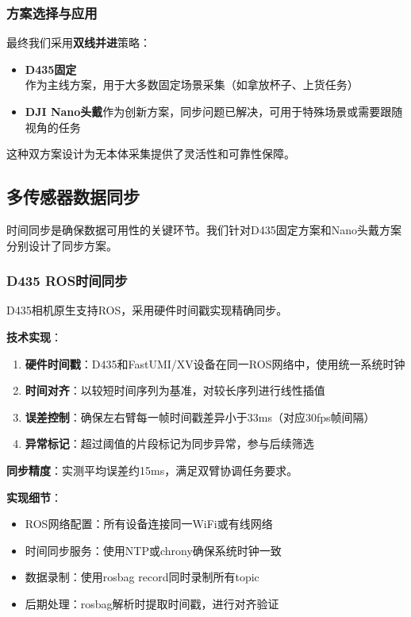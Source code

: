 \subsubsection{方案选择与应用}

最终我们采用\textbf{双线并进}策略：
\begin{itemize}[leftmargin=2em]
    \item \textbf{D435固定}作为主线方案，用于大多数固定场景采集（如拿放杯子、上货任务）
    \item \textbf{DJI Nano头戴}作为创新方案，同步问题已解决，可用于特殊场景或需要跟随视角的任务
\end{itemize}

这种双方案设计为无本体采集提供了灵活性和可靠性保障。

\subsection{多传感器数据同步}

时间同步是确保数据可用性的关键环节。我们针对D435固定方案和Nano头戴方案分别设计了同步方案。

\subsubsection{D435 ROS时间同步}

D435相机\cite{intel2018realsense}原生支持ROS\cite{quigley2009ros,koubaa2016ros}，采用硬件时间戳实现精确同步。

\textbf{技术实现}：
\begin{enumerate}[leftmargin=2em]
    \item \textbf{硬件时间戳}：D435和FastUMI/XV设备在同一ROS网络中，使用统一系统时钟
    \item \textbf{时间对齐}：以较短时间序列为基准，对较长序列进行线性插值
    \item \textbf{误差控制}：确保左右臂每一帧时间戳差异小于33ms（对应30fps帧间隔）
    \item \textbf{异常标记}：超过阈值的片段标记为同步异常，参与后续筛选
\end{enumerate}

\textbf{同步精度}：实测平均误差约15ms，满足双臂协调任务要求。

\textbf{实现细节}：
\begin{itemize}[leftmargin=2em]
    \item ROS网络配置：所有设备连接同一WiFi或有线网络
    \item 时间同步服务：使用NTP或chrony确保系统时钟一致
    \item 数据录制：使用rosbag record同时录制所有topic
    \item 后期处理：rosbag解析时提取时间戳，进行对齐验证
\end{itemize}

